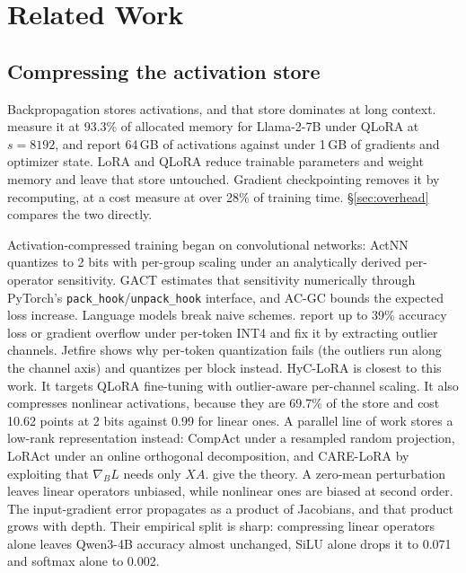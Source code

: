\documentclass[11pt,letterpaper]{article}
\begin{document}
\section{Related Work}
\label{sec:related}

\subsection{Compressing the activation store}
Backpropagation stores activations, and that store dominates at long context. \citet{hyclora2025} measure it at 93.3\% of allocated memory for Llama-2-7B under QLoRA at $s{=}8192$, and \citet{loract2025} report 64\,GB of activations against under 1\,GB of gradients and optimizer state. LoRA \citep{hu2022lora} and QLoRA \citep{dettmers2023qlora} reduce trainable parameters and weight memory and leave that store untouched. Gradient checkpointing \citep{chen2016training} removes it by recomputing, at a cost \citet{adacc2025} measure at over 28\% of training time. \S\ref{sec:overhead} compares the two directly.

Activation-compressed training began on convolutional networks: ActNN \citep{chen2021actnn} quantizes to 2 bits with per-group scaling under an analytically derived per-operator sensitivity. GACT \citep{liu2022gact} estimates that sensitivity numerically through PyTorch's \texttt{pack\_hook}/\texttt{unpack\_hook} interface, and AC-GC \citep{evans2021acgc} bounds the expected loss increase. Language models break naive schemes. \citet{adacc2025} report up to 39\% accuracy loss or gradient overflow under per-token INT4 and fix it by extracting outlier channels. Jetfire \citep{xi2024jetfire} shows why per-token quantization fails (the outliers run along the channel axis) and quantizes per block instead. HyC-LoRA \citep{hyclora2025} is closest to this work. It targets QLoRA fine-tuning with outlier-aware per-channel scaling. It also compresses nonlinear activations, because they are 69.7\% of the store and cost 10.62 points at 2 bits against 0.99 for linear ones. A parallel line of work stores a low-rank representation instead: CompAct \citep{shamshoum2025compact} under a resampled random projection, LoRAct \citep{loract2025} under an online orthogonal decomposition, and CARE-LoRA \citep{carelora2026} by exploiting that $\nabla_B L$ needs only $XA$. \citet{actcomp2026} give the theory. A zero-mean perturbation leaves linear operators unbiased, while nonlinear ones are biased at second order. The input-gradient error propagates as a product of Jacobians, and that product grows with depth. Their empirical split is sharp: compressing linear operators alone leaves Qwen3-4B accuracy almost unchanged, SiLU alone drops it to 0.071 and softmax alone to 0.002.
\end{document}
